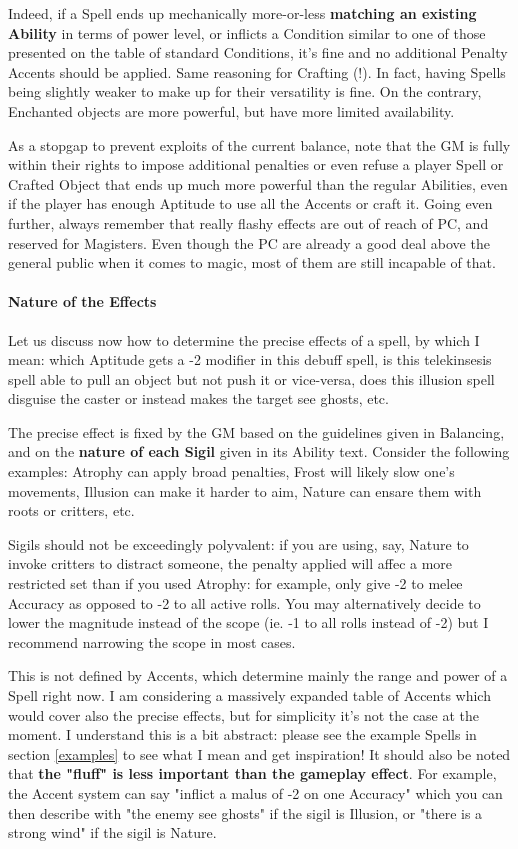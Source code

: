 Indeed, if a Spell ends up mechanically more-or-less \textbf{matching an existing Ability} in terms of power level, or inflicts a Condition similar to one of those presented on the table of standard Conditions, it's fine and no additional Penalty Accents should be applied. Same reasoning for Crafting (!). In fact, having Spells being slightly weaker to make up for their versatility is fine. On the contrary, Enchanted objects are more powerful, but have more limited availability.

As a stopgap to prevent exploits of the current balance, note that the GM is fully within their rights to impose additional penalties or even refuse a player Spell or Crafted Object that ends up much more powerful than the regular Abilities, even if the player has enough Aptitude to use all the Accents or craft it. Going even further, always remember that really flashy effects are out of reach of PC, and reserved for Magisters. Even though the PC are already a good deal above the general public when it comes to magic, most of them are still incapable of that.


\paragraph{Nature of the Effects}

Let us discuss now how to determine the precise effects of a spell, by which I mean: which Aptitude gets a -2 modifier in this debuff spell, is this telekinsesis spell able to pull an object but not push it or vice-versa, does this illusion spell disguise the caster or instead makes the target see ghosts, etc. 

The precise effect is fixed by the GM based on the guidelines given in Balancing, and on the \textbf{nature of each Sigil} given in its Ability text. Consider the following examples: Atrophy can apply broad penalties, Frost will likely slow one's movements, Illusion can make it harder to aim, Nature can ensare them with roots or critters, etc. 

Sigils should not be exceedingly polyvalent: if you are using, say, Nature to invoke critters to distract someone, the penalty applied will affec a more restricted set than if you used Atrophy: for example, only give -2 to melee Accuracy as opposed to -2 to all active rolls. You may alternatively decide to lower the magnitude instead of the scope (ie. -1 to all rolls instead of -2) but I recommend narrowing the scope in most cases.

This is not defined by Accents, which determine mainly the range and power of a Spell right now. I am considering a massively expanded table of Accents which would cover also the precise effects, but for simplicity it's not the case at the moment. I understand this is a bit abstract: please see the example Spells in section \ref{examples} to see what I mean and get inspiration! It should also be noted that \textbf{the "fluff" is less important than the gameplay effect}. For example, the Accent system can say "inflict a malus of -2 on one Accuracy" which you can then describe with "the enemy see ghosts" if the sigil is Illusion, or "there is a strong wind" if the sigil is Nature.

